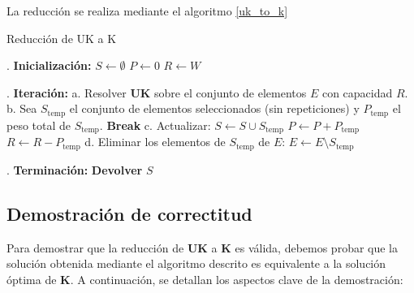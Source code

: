\documentclass{report}
\begin{document}
La reducción se realiza mediante el algoritmo \ref{uk_to_k}


\begin{algorithm}\label{uk_to_k}\caption{Reducción de UK a K}

	\State
	. \textbf{Inicialización:}
	\State \quad \( S \gets \emptyset \)  
	\State \quad \( P \gets 0 \)          
	\State \quad \( R \gets W \)          
	
	\State
	. \textbf{Iteración:}
	\State \quad a. Resolver \textbf{UK} sobre el conjunto de elementos \( E \) con capacidad \( R \).
	\State \quad b. Sea \( S_{\text{temp}} \) el conjunto de elementos seleccionados (sin repeticiones) y \( P_{\text{temp}} \) el peso total de \( S_{\text{temp}} \).
	\State \quad \quad \textbf{Break}  
	\EndIf
	\State \quad c. Actualizar:
	\State \quad \quad \( S \gets S \cup S_{\text{temp}} \)
	\State \quad \quad \( P \gets P + P_{\text{temp}} \)
	\State \quad \quad \( R \gets R - P_{\text{temp}} \)
	\State \quad d. Eliminar los elementos de \( S_{\text{temp}} \) de \( E \): \( E \gets E \setminus S_{\text{temp}} \)
	\EndWhile
	
	\State
	. \textbf{Terminación:}
	\State \quad \textbf{Devolver} \( S \)  
\end{algorithm}

\subsection*{Demostración de correctitud}

Para demostrar que la reducción de \textbf{UK} a \textbf{K} es válida, debemos probar que la solución obtenida mediante el algoritmo descrito es equivalente a la solución óptima de \textbf{K}. A continuación, se detallan los aspectos clave de la demostración:
\end{document}
